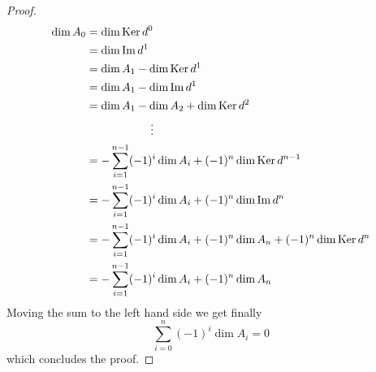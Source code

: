 \begin{proof}
\begin{align*}
    \dim A_0 
    &= \dim\operatorname{Ker} d^0 \\
    &= \dim\operatorname{Im} d^1 \\
    &= \dim A_1 - \dim\operatorname{Ker} d^1 \\
    &= \dim A_1 - \dim\operatorname{Im} d^1 \\
    &= \dim A_1 - \dim A_2 + \dim\operatorname{Ker} d^2 \\
    &\hspace{2cm}\vdots \\
    &= -\sum_{i=1}^{n-1}(-1)^i \dim A_i + (-1)^{n}\dim\operatorname{Ker} d^{n-1} \\
    &= -\sum_{i=1}^{n-1}(-1)^i \dim A_i + (-1)^n\dim\operatorname{Im} d^n \\
    &= -\sum_{i=1}^{n-1}(-1)^i \dim A_i + (-1)^n\dim A_n + (-1)^n\dim\operatorname{Ker} d^n  \\
    &= -\sum_{i=1}^{n-1}(-1)^i \dim A_i + (-1)^n\dim A_n \\
\end{align*}
Moving the sum to the left hand side we get finally
\begin{equation*}
    \sum_{i=0}^{n}(-1)^i \dim A_i = 0
\end{equation*}
which concludes the proof.
\end{proof}


